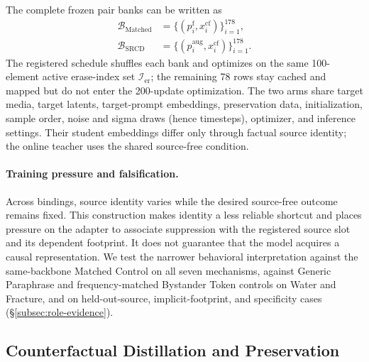The complete frozen pair banks can be written as
\begin{align}
  \mathcal{B}_{\mathrm{Matched}}
    &= \{(p_i^{\mathrm{f}},x_i^{\mathrm{cf}})\}_{i=1}^{178},
      \label{eq:matched-pairs}\\
  \mathcal{B}_{\mathrm{SRCD}}
    &= \{(p_i^{\mathrm{aug}},x_i^{\mathrm{cf}})\}_{i=1}^{178}.
      \label{eq:srcd-pairs}
\end{align}
The registered schedule shuffles each bank and optimizes on the same
100-element active erase-index set \(\mathcal{I}_{\mathrm{er}}\); the remaining
78 rows stay cached and mapped but do not enter the 200-update optimization.
The two arms share target media, target latents, target-prompt embeddings,
preservation data, initialization, sample order, noise and sigma draws
(hence timesteps), optimizer, and inference settings. Their student embeddings
differ only through factual source identity; the online teacher uses the shared
source-free condition.

\paragraph{Training pressure and falsification.}
Across bindings, source identity varies while the desired source-free outcome
remains fixed. This construction makes identity a less reliable shortcut and
places pressure on the adapter to associate suppression with the registered
source slot and its dependent footprint. It does not guarantee that the model
acquires a causal representation. We test the narrower behavioral
interpretation against the same-backbone Matched Control on all seven
mechanisms, against Generic Paraphrase and frequency-matched Bystander Token
controls on Water and Fracture, and on held-out-source, implicit-footprint,
and specificity cases (\S\ref{subsec:role-evidence}).

\subsection{Counterfactual Distillation and Preservation}
\label{subsec:training-objectives}

